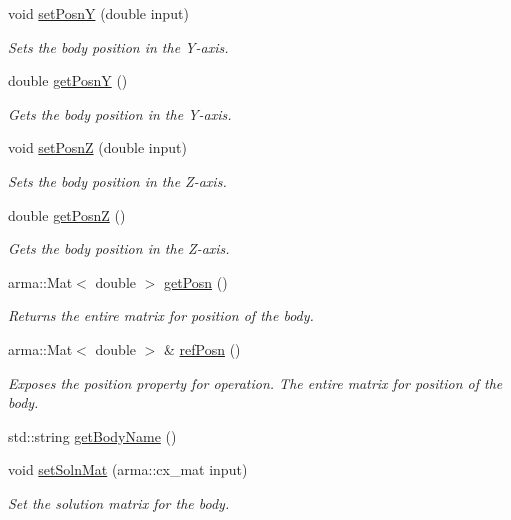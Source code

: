 \begin{DoxyCompactItemize}
void \hyperlink{classosea_1_1ofreq_1_1_body_a782d1cf6280cebe6857a1aef764d2572}{set\-Posn\-Y} (double input)
\begin{DoxyCompactList}\small\item\em Sets the body position in the Y-\/axis. \end{DoxyCompactList}\item 
double \hyperlink{classosea_1_1ofreq_1_1_body_ad4b9a74035b9fcb1af31d2ce300911c4}{get\-Posn\-Y} ()
\begin{DoxyCompactList}\small\item\em Gets the body position in the Y-\/axis. \end{DoxyCompactList}\item 
void \hyperlink{classosea_1_1ofreq_1_1_body_a36a7e543c0bdad30bb16eda563543ac4}{set\-Posn\-Z} (double input)
\begin{DoxyCompactList}\small\item\em Sets the body position in the Z-\/axis. \end{DoxyCompactList}\item 
double \hyperlink{classosea_1_1ofreq_1_1_body_aaeddfd614683a8bc7fe81383667314a9}{get\-Posn\-Z} ()
\begin{DoxyCompactList}\small\item\em Gets the body position in the Z-\/axis. \end{DoxyCompactList}\item 
arma\-::\-Mat$<$ double $>$ \hyperlink{classosea_1_1ofreq_1_1_body_a09987e449c77ba11fb66cf81de88220a}{get\-Posn} ()
\begin{DoxyCompactList}\small\item\em Returns the entire matrix for position of the body. \end{DoxyCompactList}\item 
arma\-::\-Mat$<$ double $>$ \& \hyperlink{classosea_1_1ofreq_1_1_body_ad34f38992e14d5bda02c481c311b66b3}{ref\-Posn} ()
\begin{DoxyCompactList}\small\item\em Exposes the position property for operation. The entire matrix for position of the body. \end{DoxyCompactList}\item 
std\-::string \hyperlink{classosea_1_1ofreq_1_1_body_aab63febbe35984d8551a188b40ee3c3f}{get\-Body\-Name} ()
\item 
void \hyperlink{classosea_1_1ofreq_1_1_body_a4131658e5b392e8a5cd6475b69fae06d}{set\-Soln\-Mat} (arma\-::cx\-\_\-mat input)
\begin{DoxyCompactList}\small\item\em Set the solution matrix for the body. \end{DoxyCompactList}\item 

\end{DoxyCompactItemize}
